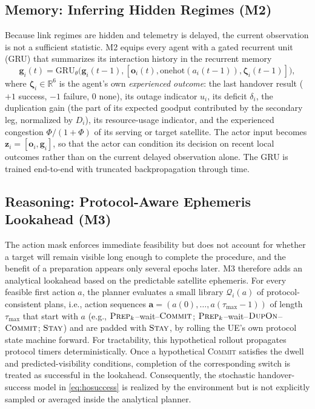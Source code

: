 \documentclass[journal]{IEEEtran}
\begin{document}
\subsection{Memory: Inferring Hidden Regimes (M2)}

Because link regimes are hidden and telemetry is delayed, the current
observation is not a sufficient statistic. M2 equips every agent with a gated
recurrent unit (GRU) that summarizes its interaction history in the recurrent
memory
\begin{equation}
\mathbf{g}_i(t)=\mathrm{GRU}_\theta\big(\mathbf{g}_i(t-1),[\mathbf{o}_i(t),\mathrm{onehot}(a_i(t-1)),\boldsymbol\zeta_i(t-1)]\big),
\end{equation}
where $\boldsymbol\zeta_i\in\mathbb{R}^6$ is the agent's own \emph{experienced
outcome}: the last handover result ($+1$ success, $-1$ failure, $0$ none), its
outage indicator $u_i$, its deficit $\delta_i$, the duplication gain (the part
of its expected goodput contributed by the secondary leg, normalized by
$D_i$), its resource-usage indicator, and the experienced congestion
$\Phi/(1+\Phi)$ of its serving or target satellite. The actor input becomes $\mathbf{z}_i=[\mathbf{o}_i,\mathbf{g}_i]$, so that
the actor can condition its decision on recent local outcomes rather than on
the current delayed observation alone. The GRU is trained end-to-end with truncated backpropagation through
time.

\subsection{Reasoning: Protocol-Aware Ephemeris Lookahead (M3)}

The action mask enforces immediate feasibility but does not account for
whether a target will remain visible long enough to complete the procedure,
and the benefit of a preparation appears only several epochs later. M3
therefore adds an analytical lookahead based on the predictable satellite
ephemeris. For every feasible
first action $a$, the planner evaluates a small library $\mathcal{Q}_i(a)$ of
protocol-consistent plans, i.e., action sequences
$\mathbf{a}=(a(0),\dots,a(\tau_{\max}-1))$ of length $\tau_{\max}$ that start
with $a$ (e.g., $\textsc{Prep}_k$--wait--$\textsc{Commit}$;
$\textsc{Prep}_k$--wait--$\textsc{DupOn}$--$\textsc{Commit}$; $\textsc{Stay}$)
and are padded with $\textsc{Stay}$, by rolling the UE's own protocol state
machine forward. For tractability, this hypothetical rollout propagates
protocol timers deterministically. Once a hypothetical \textsc{Commit}
satisfies the dwell and predicted-visibility conditions, completion of the
corresponding switch is treated as successful in the lookahead. Consequently,
the stochastic handover-success model in \eqref{eq:hosuccess} is realized by
the environment but is not explicitly sampled or averaged inside the
analytical planner.
\end{document}
